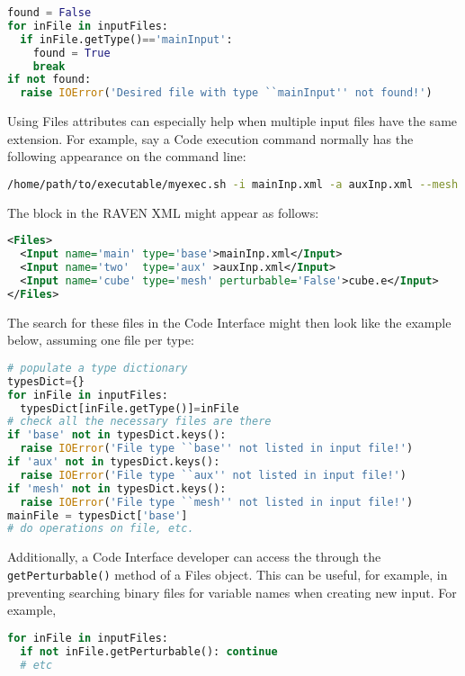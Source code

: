 \begin{lstlisting}[language=python,showstringspaces=false]
found = False
for inFile in inputFiles:
  if inFile.getType()=='mainInput':
    found = True
    break
if not found:
  raise IOError('Desired file with type ``mainInput'' not found!')
\end{lstlisting}
Using Files  attributes can especially help when multiple input files have the same extension.  For example, say a Code execution command normally has the following appearance on the command line:
\begin{lstlisting}[language=bash]
/home/path/to/executable/myexec.sh -i mainInp.xml -a auxInp.xml --mesh cube.e
\end{lstlisting}
The  block in the RAVEN XML might appear as follows:
\begin{lstlisting}[language=XML]
<Files>
  <Input name='main' type='base'>mainInp.xml</Input>
  <Input name='two'  type='aux' >auxInp.xml</Input>
  <Input name='cube' type='mesh' perturbable='False'>cube.e</Input>
</Files>
\end{lstlisting}
The search for these files in the Code Interface might then look like the example below, assuming one file per type:
\begin{lstlisting}[language=python,showstringspaces=false]
# populate a type dictionary
typesDict={}
for inFile in inputFiles:
  typesDict[inFile.getType()]=inFile
# check all the necessary files are there
if 'base' not in typesDict.keys():
  raise IOError('File type ``base'' not listed in input file!')
if 'aux' not in typesDict.keys():
  raise IOError('File type ``aux'' not listed in input file!')
if 'mesh' not in typesDict.keys():
  raise IOError('File type ``mesh'' not listed in input file!')
mainFile = typesDict['base']
# do operations on file, etc.
\end{lstlisting}

Additionally, a Code Interface developer can access the  through the \texttt{getPerturbable()} method of a Files object.  This can be useful, for example, in preventing searching binary files for variable names when creating new input. For example,
\begin{lstlisting}[language=python]
for inFile in inputFiles:
  if not inFile.getPerturbable(): continue
  # etc
\end{lstlisting}
